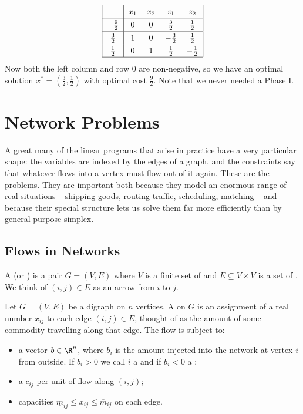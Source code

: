 \begin{example}
    $$
    \arraycolsep=6pt\def\arraystretch{1.3}
    \begin{array}{|c|cccc|}\hline
        \multicolumn{1}{|c|}{} & x_1 & x_2 & z_1 & z_2\\\hline
        -\frac92 & 0 & 0 & \frac32 & \frac12\\\hline
        \frac32 & 1 & 0 & -\frac32 & \frac12\\
        \frac12 & 0 & 1 & \frac12 & -\frac12\\\hline
    \end{array}
    $$
    Now both the left column and row $0$ are non-negative, so we have an optimal solution $x^* = (\frac32, \frac12)$ with optimal cost $\frac92$. Note that we never needed a Phase I.
\end{example}

\section{Network Problems}

A great many of the linear programs that arise in practice have a very particular shape: the variables are indexed by the edges of a graph, and the constraints say that whatever flows into a vertex must flow out of it again. These are the  problems. They are important both because they model an enormous range of real situations -- shipping goods, routing traffic, scheduling, matching -- and because their special structure lets us solve them far more efficiently than by general-purpose simplex.

\subsection{Flows in Networks}

\begin{definition}
    A  (or ) is a pair $G = (V, E)$ where $V$ is a finite set of  and $E \subseteq V \times V$ is a set of . We think of $(i,j) \in E$ as an arrow from $i$ to $j$.
\end{definition}

\begin{definition}[Flow]
    Let $G = (V,E)$ be a digraph on $n$ vertices. A  on $G$ is an assignment of a real number $x_{ij}$ to each edge $(i,j) \in E$, thought of as the amount of some commodity travelling along that edge. The flow is subject to:
    \begin{itemize}
        \item a vector $b \in \R^n$, where $b_i$ is the amount injected into the network at vertex $i$ from outside. If $b_i > 0$ we call $i$ a  and if $b_i < 0$ a ;
        \item a  $c_{ij}$ per unit of flow along $(i,j)$;
        \item capacities $\underline m_{ij} \leq x_{ij} \leq \overline m_{ij}$ on each edge.
    \end{itemize}
\end{definition}

